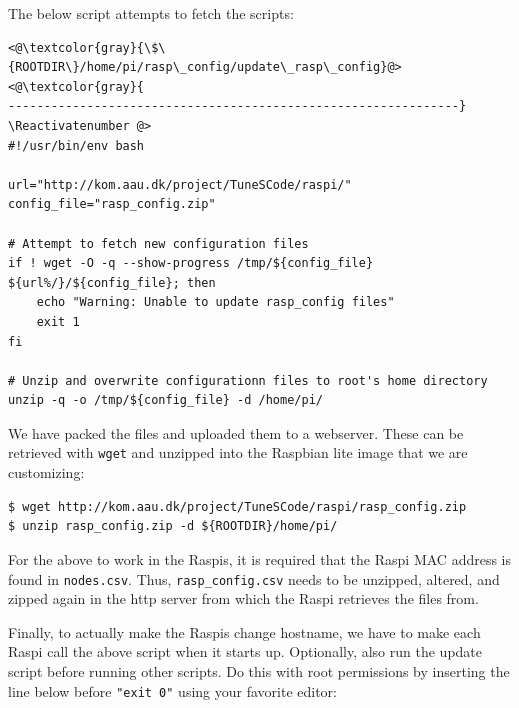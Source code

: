 The below script attempts to fetch the scripts:

\Suppressnumber\begin{lstlisting}[]
<@\textcolor{gray}{\$\{ROOTDIR\}/home/pi/rasp\_config/update\_rasp\_config}@>
<@\textcolor{gray}{
---------------------------------------------------------------}
\Reactivatenumber @>
#!/usr/bin/env bash

url="http://kom.aau.dk/project/TuneSCode/raspi/"
config_file="rasp_config.zip"

# Attempt to fetch new configuration files
if ! wget -O -q --show-progress /tmp/${config_file} ${url%/}/${config_file}; then
    echo "Warning: Unable to update rasp_config files"
    exit 1
fi

# Unzip and overwrite configurationn files to root's home directory
unzip -q -o /tmp/${config_file} -d /home/pi/
\end{lstlisting}
\FloatBarrier
\vspace{-5mm}


We have packed the files and uploaded them to a webserver. These can be
retrieved with \texttt{wget} and unzipped into the Raspbian lite image that
we are customizing:

\begin{lstlisting}[]
$ wget http://kom.aau.dk/project/TuneSCode/raspi/rasp_config.zip
$ unzip rasp_config.zip -d ${ROOTDIR}/home/pi/
\end{lstlisting}
\FloatBarrier
\vspace{-5mm}

For the above to work in the \ac{Raspi}s, it is required that the \ac{Raspi}
\ac{MAC} address is found in \texttt{nodes.csv}. Thus,
\texttt{rasp\_config.csv} needs to be unzipped, altered, and zipped again in
the http server from which the \ac{Raspi} retrieves the files from.


Finally, to actually make the \ac{Raspi}s change hostname, we have to make
each \ac{Raspi} call the above script when it starts up. Optionally,
also run the update script before running other scripts.
Do this with root permissions by inserting the line below before
\texttt{"exit 0"} using your favorite editor:


